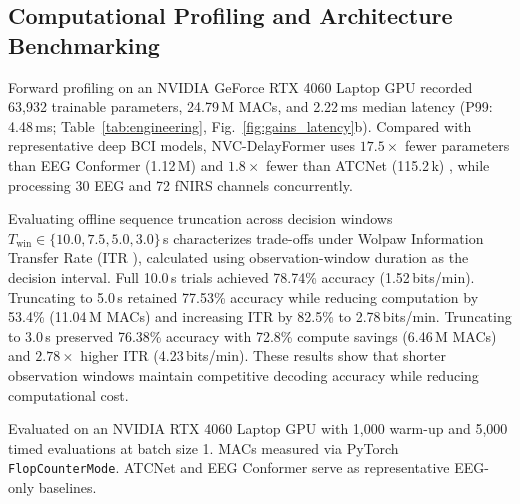 \documentclass[journal]{IEEEtran}
\begin{document}
\subsection{Computational Profiling and Architecture Benchmarking}
Forward profiling on an NVIDIA GeForce RTX 4060 Laptop GPU recorded 63,932 trainable parameters, 24.79\,M MACs, and 2.22\,ms median latency (P99: 4.48\,ms; Table~\ref{tab:engineering}, Fig.~\ref{fig:gains_latency}b). Compared with representative deep BCI models, NVC-DelayFormer uses $17.5\times$ fewer parameters than EEG Conformer (1.12\,M) \cite{song2022eeg} and $1.8\times$ fewer than ATCNet (115.2\,k) \cite{altaheri2023atcnet}, while processing 30 EEG and 72 fNIRS channels concurrently.

Evaluating offline sequence truncation across decision windows $T_{\mathrm{win}} \in \{10.0, 7.5, 5.0, 3.0\}$\,s characterizes trade-offs under Wolpaw Information Transfer Rate (ITR \cite{wolpaw2002brain}), calculated using observation-window duration as the decision interval. Full 10.0\,s trials achieved 78.74\% accuracy (1.52\,bits/min). Truncating to 5.0\,s retained 77.53\% accuracy while reducing computation by 53.4\% (11.04\,M MACs) and increasing ITR by 82.5\% to 2.78\,bits/min. Truncating to 3.0\,s preserved 76.38\% accuracy with 72.8\% compute savings (6.46\,M MACs) and $2.78\times$ higher ITR (4.23\,bits/min). These results show that shorter observation windows maintain competitive decoding accuracy while reducing computational cost.

\begin{table}[!t]
\centering
\caption{Model complexity and batch-one GPU forward latency measurements.}
\label{tab:engineering}
{\footnotesize
\setlength{\tabcolsep}{3.5pt}
}
\par\smallskip
{\scriptsize Evaluated on an NVIDIA RTX 4060 Laptop GPU with 1,000 warm-up and 5,000 timed evaluations at batch size 1. MACs measured via PyTorch \texttt{FlopCounterMode}. ATCNet and EEG Conformer serve as representative EEG-only baselines.}
\end{table}
\end{document}
